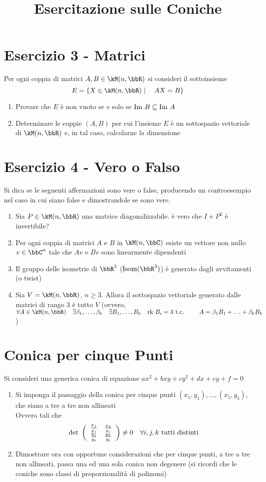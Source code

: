 \documentclass[a4paper,NoNotes,GeneralMath]{stdmdoc}
\begin{document}
	\section*{Esercizio 3 - Matrici}
	Per ogni coppia di matrici $A, B \in \kM(n, \bbR)$ si consideri il sottoinsieme $$ E = \{ X \in \kM(n,\bbR) \mid \quad AX = B \} $$
	\begin{enumerate}
		\item Provare che $E$ è non vuoto se e solo se $\mbox{Im } B \subseteq \mbox{Im } A$
		\item Determinare le coppie $(A, B)$ per cui l'insieme $E$ è un sottospazio vettoriale di $\kM(n, \bbR)$ e, in tal caso, calcolarne la dimensione
	\end{enumerate}

	\section*{Esercizio 4 - Vero o Falso}
	Si dica se le seguenti affermazioni sono vere o false, producendo un controesempio nel caso in cui siano false e dimostrandole se sono vere.
	\begin{enumerate}
		\item Sia $P \in \kM(n,\bbR)$ una matrice diagonalizzabile. è vero che $I + P^2$ è invertibile?
		\item Per ogni coppia di matrici $A$ e $B$ in $\kM(n, \bbC)$ esiste un vettore non nullo $v \in \bbC^n$ tale che $Av$ e $Bv$ sono linearmente dipendenti
		\item Il gruppo delle isometrie di $\bbR^3$ ($\Isom(\bbR^3)$) è generato dagli avvitamenti (o twist)
		\item Sia $V = \kM(n, \bbR)$, $n \ge 3$. Allora il sottospazio vettoriale generato dalle matrici di rango $3$ è tutto $V$ (ovvero, $\forall A \in \kM(n,\bbR) \quad \exists \beta_1, \ldots, \beta_k \quad \exists B_1, \ldots, B_k \quad \Rk B_i = 3 \tc \qquad A = \beta_1 B_1 + \ldots + \beta_k B_k$)
	\end{enumerate}
	
	\newpage
	\title{Esercitazione sulle Coniche}
	\section*{Conica per cinque Punti}
	Si consideri una generica conica di equazione $ax^2 + bxy + cy^2 + dx + ey + f = 0$
	\begin{enumerate}
		\item Si imponga il passaggio della conica per cinque punti $(x_1, y_1), \ldots, (x_5, y_5)$, che siano a tre a tre non allineati \\Ovvero tali che $$\mbox{det } \left( \begin{array}{cc} \frac{x_j}{x_i} & \frac{x_k}{x_i} \\ \frac{y_j}{y_i} & \frac{y_k}{y_i} \end{array} \right) \neq 0 \quad \forall i,j,k \text{ tutti distinti}$$
		\item Dimostrare ora con opportune considerazioni che per cinque punti, a tre a tre non allineati, passa una ed una sola conica non degenere (si ricordi che le coniche sono classi di proporzionalità di polinomi)
	\end{enumerate}
\end{document}
